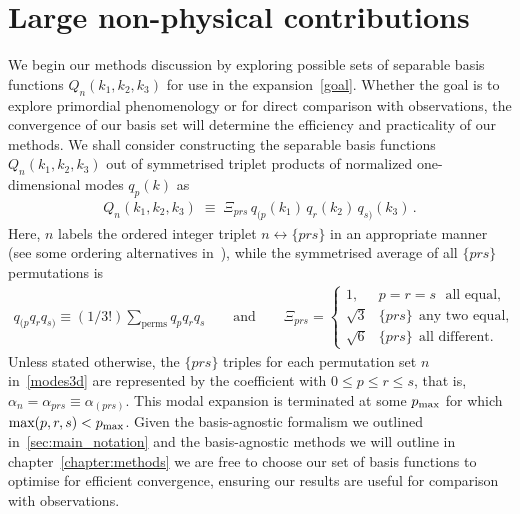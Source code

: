 \section{Large non-physical contributions}\label{sec:large_non_physical}
We begin our methods discussion by exploring possible sets of separable
basis functions $Q_n(k_1,k_2,k_3)$
for use in the expansion~\eqref{goal}.
Whether the goal is to explore primordial phenomenology or for direct comparison with observations,
the convergence of our basis set will determine the efficiency and practicality
of our methods.
We shall consider constructing the separable basis functions $Q_n(k_1,k_2,k_3)$
out of symmetrised triplet products of normalized one-dimensional modes $q_p(k)$ as
\begin{align}\label{modes3d}
    Q_n(k_1,k_2,k_3) \;\equiv\; {\Xi_{prs} } \, q_{(p} (k_1) \, q_{r}(k_2)\, q_{s)}(k_3)\,.
\end{align}
Here,  $n$ labels the ordered integer triplet $n \leftrightarrow \{p r s\}$ in an appropriate manner (see some ordering alternatives in~\cite{FergShell_3}), while the symmetrised average of all $\{p r s\}$ permutations is 
\begin{align}\label{modes3dsum}
    q_{(p}q_{r}q_{s)}\equiv(1/3!)\sum_\text{perms}q_{p}q_{r}q_{s}\qquad \text{and} \qquad 
     \Xi_{prs}= 
     \begin{cases}
     1, & p = r = s ~~~\text{all equal},\\
     \sqrt{3} & \{p r s\} ~~\text{any two equal,} \\
     \sqrt{6} & \{p r s\}  ~~\text{all  different.}
     \end{cases}
\end{align}
Unless stated otherwise, the $\{prs\}$ triples for each permutation set $n$
in~\eqref{modes3d} are represented by the coefficient with $0\le p\le r\le s$,
that is, $\alpha_n = \alpha_{prs} \equiv \alpha_{(prs)}$.
This modal expansion is terminated at some $p_\text{max}$ for which $\text{max}(p,r,s)<p_\text{max}$. 
Given the basis-agnostic formalism we outlined in~\ref{sec:main_notation} and
the basis-agnostic methods we will outline in chapter~\ref{chapter:methods}
we are free to choose our set of basis functions to optimise for efficient convergence,
ensuring our results are useful for comparison with observations. 
